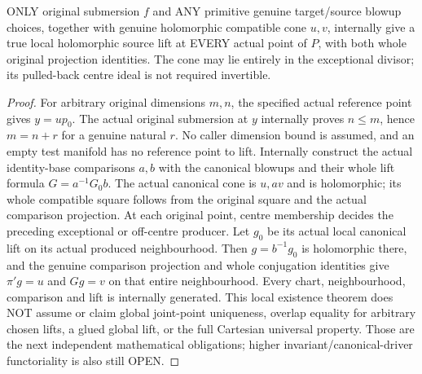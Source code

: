 \begin{theorem}
\label{hir:submersion-blowup-local-cone-arbitrary-choices}
\leanok
{}
ONLY original submersion $f$ and ANY primitive genuine target/source blowup
choices, together with genuine holomorphic compatible cone $u,v$, internally
give a true local holomorphic source lift at EVERY actual point of $P$, with
both whole original projection identities. The cone may lie entirely in the
exceptional divisor; its pulled-back centre ideal is not required invertible.
\end{theorem}
\begin{proof}
For arbitrary original dimensions $m,n$, the specified actual reference
point gives $y=u p_0$. The actual original submersion at $y$ internally
proves $n\leq m$, hence $m=n+r$ for a genuine natural $r$. No caller
dimension bound is assumed, and an empty test manifold has no reference
point to lift. Internally construct the actual identity-base comparisons $a,b$ with the
canonical blowups and their whole lift formula $G=a^{-1}G_0b$. The actual
canonical cone is $u,av$ and is holomorphic; its whole compatible square
follows from the original square and the actual comparison projection.
At each original point, centre membership decides the preceding exceptional
or off-centre producer. Let $g_0$ be its actual local canonical lift on its
actual produced neighbourhood. Then $g=b^{-1}g_0$ is holomorphic there, and
the genuine comparison projection and whole conjugation identities give
$\pi'g=u$ and $Gg=v$ on that entire neighbourhood. Every chart, neighbourhood,
comparison and lift is internally generated. This local existence theorem
does NOT assume or claim global joint-point uniqueness, overlap equality for
arbitrary chosen lifts, a glued global lift, or the full Cartesian universal
property. Those are the next independent mathematical obligations; higher
invariant/canonical-driver functoriality is also still OPEN.
\end{proof}
